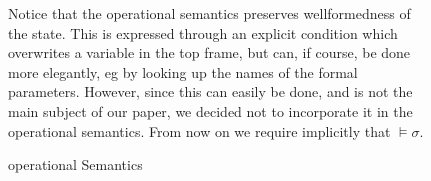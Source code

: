 \begin{figure}[t]
\begin{minipage}{\textwidth}
\begin{minipage}{\textwidth}
\caption{\LangOO operational Semantics}
\label{f:loo-semantics}
\end{minipage}

Notice that the operational semantics preserves wellformedness of the state.
This is expressed through an explicit condition which overwrites a variable in the top frame, but can, if course, be done more elegantly, eg by looking up the names of the formal parameters. However, since this can easily be done, and is not the main subject of our paper, we decided not to incorporate it in the operational semantics.
From now on we require implicitly that $\models \sigma$.


\end{minipage}
\end{figure}
